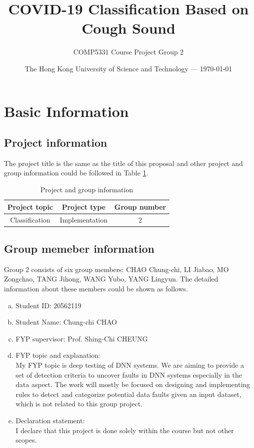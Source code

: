 \documentclass[11pt]{article}
\title{COVID-19 Classification Based on Cough Sound} %
\author{COMP5331 Course Project Group 2 } %
\date{The Hong Kong University of Science and Technology --- \today} %
\begin{document}
\maketitle %


\section{Basic Information}
\subsection{Project information}
The project title is the same as the title of this proposal and other project and
group information could be followed in Table \ref{tab1}.
\begin{table}[!htbp]
	\caption{Project and group information} \centering
	\label{tab1}
	\begin{tabular}{ccc}
	\toprule[1.5pt]
	Project topic  & Project type & Group number \\
    \midrule[1pt]
    Classification & Implementation & 2 \\
	\bottomrule[1.5pt]
	\end{tabular}
\end{table}

\subsection{Group memeber information}
Group 2 consists of  six group members: CHAO Chung-chi, LI Jiabao, MO Zongchao, TANG Jihong,
WANG Yubo, YANG Lingyun. The detailed information about these members could be shown as
follows.

\begin{member}
	\begin{enumerate}[(a)]
		\item Student ID: 20562119
		\item Student Name: Chung-chi CHAO
		\item FYP supervisor: Prof. Shing-Chi CHEUNG
		\item FYP topic and explanation: \\
		My FYP topic is deep testing of DNN systems. We are aiming to provide a set of detection criteria to uncover faults in DNN systems especially in the data aspect. The work will mostly be focused on designing and implementing rules to detect and categorize potential data faults given an input dataset, which is not related to this group project.
		\item Declaration statement: \\
		I declare that this project is done solely within the course but not other scopes.
	\end{enumerate}
\end{member}
\end{document}
